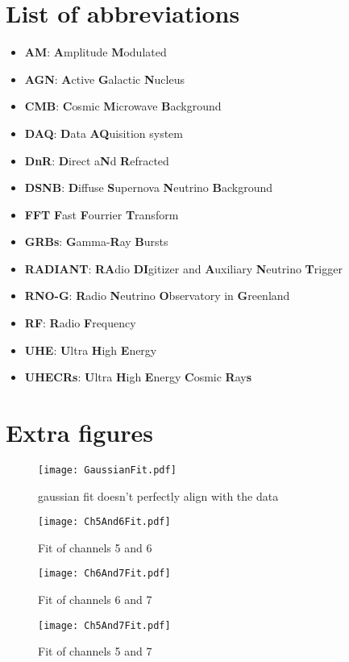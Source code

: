 \appendix
\chapter{List of abbreviations}
\begin{itemize}
\item \textbf{AM}: \textbf{A}mplitude \textbf{M}odulated
\item \textbf{AGN}: \textbf{A}ctive \textbf{G}alactic \textbf{N}ucleus
\item \textbf{CMB}: \textbf{C}osmic \textbf{M}icrowave \textbf{B}ackground
\item \textbf{DAQ}: \textbf{D}ata \textbf{AQ}uisition system
\item \textbf{DnR}: \textbf{D}irect a\textbf{N}d \textbf{R}efracted
\item \textbf{DSNB}: \textbf{D}iffuse \textbf{S}upernova \textbf{N}eutrino \textbf{B}ackground
\item \textbf{FFT} \textbf{F}ast \textbf{F}ourrier \textbf{T}ransform
\item \textbf{GRBs}: \textbf{G}amma-\textbf{R}ay \textbf{B}ursts
\item \textbf{RADIANT}: \textbf{RA}dio \textbf{DI}gitizer and \textbf{A}uxiliary \textbf{N}eutrino \textbf{T}rigger
\item \textbf{RNO-G}: \textbf{R}adio \textbf{N}eutrino \textbf{O}bservatory in \textbf{G}reenland
\item \textbf{RF}: \textbf{R}adio \textbf{F}requency
\item \textbf{UHE}: \textbf{U}ltra \textbf{H}igh \textbf{E}nergy 
\item \textbf{UHECRs}: \textbf{U}ltra \textbf{H}igh \textbf{E}nergy \textbf{C}osmic \textbf{R}ay\textbf{s}
\end{itemize}
\chapter{Extra figures}
\label{app:EF}
\begin{figure}[h!]
	\centering
	\texttt{[image: GaussianFit.pdf]}
	\caption{gaussian fit doesn't perfectly align with the data}
	\label{fig:GaussFit}
\end{figure}
\begin{figure}
	\centering
	\texttt{[image: Ch5And6Fit.pdf]}
	\caption{Fit of channels 5 and 6}
	\label{fig:Ch5And6}
\end{figure}
\begin{figure}
	\centering
	\texttt{[image: Ch6And7Fit.pdf]}
	\caption{Fit of channels 6 and 7}
	\label{fig:Ch6And7}
\end{figure}
\begin{figure}
	\centering
	\texttt{[image: Ch5And7Fit.pdf]}
	\caption{Fit of channels 5 and 7}
	\label{fig:Ch5And7}
\end{figure}

